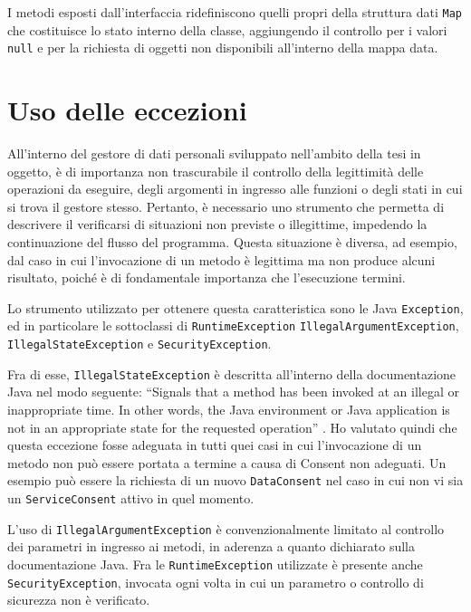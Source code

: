 I metodi esposti dall’interfaccia ridefiniscono quelli propri della struttura dati \texttt{Map} che costituisce lo stato interno della classe, aggiungendo il controllo per i valori \texttt{null} e per la richiesta di oggetti non disponibili all’interno della mappa data.

\section{Uso delle eccezioni}
All’interno del gestore di dati personali sviluppato nell’ambito della tesi in oggetto, \`e di importanza non trascurabile il controllo della legittimit\`a delle operazioni da eseguire, degli argomenti in ingresso alle funzioni o degli stati in cui si trova il gestore stesso. Pertanto, \`e necessario uno strumento che permetta di descrivere il verificarsi di situazioni non previste o illegittime, impedendo la continuazione del flusso del programma. Questa situazione \`e diversa, ad esempio, dal caso in cui l’invocazione di un metodo \`e legittima ma non produce alcuni risultato, poich\'e \`e di fondamentale importanza che l’esecuzione termini.

Lo strumento utilizzato per ottenere questa caratteristica sono le Java \texttt{Exception}, ed in particolare le sottoclassi di \texttt{RuntimeException} \texttt{IllegalArgumentException}, \texttt{IllegalStateException} e \texttt{SecurityException}. 

Fra di esse, \texttt{IllegalStateException} \`e descritta all’interno della documentazione Java nel modo seguente: “Signals that a method has been invoked at an illegal or inappropriate time. In other words, the Java environment or Java application is not in an appropriate state for the requested operation” \cite{java8api}. Ho valutato quindi che questa eccezione fosse adeguata in tutti quei casi in cui l’invocazione di un metodo non pu\`o essere portata a termine a causa di Consent non adeguati. Un esempio pu\`o essere la richiesta di un nuovo \texttt{DataConsent} nel caso in cui non vi sia un \texttt{ServiceConsent} attivo in quel momento.

L’uso di \texttt{IllegalArgumentException} \`e convenzionalmente limitato al controllo dei parametri in ingresso ai metodi, in aderenza a quanto dichiarato sulla documentazione Java. Fra le \texttt{RuntimeException} utilizzate \`e presente anche \texttt{SecurityException}, invocata ogni volta in cui un parametro o controllo di sicurezza non \`e verificato.

